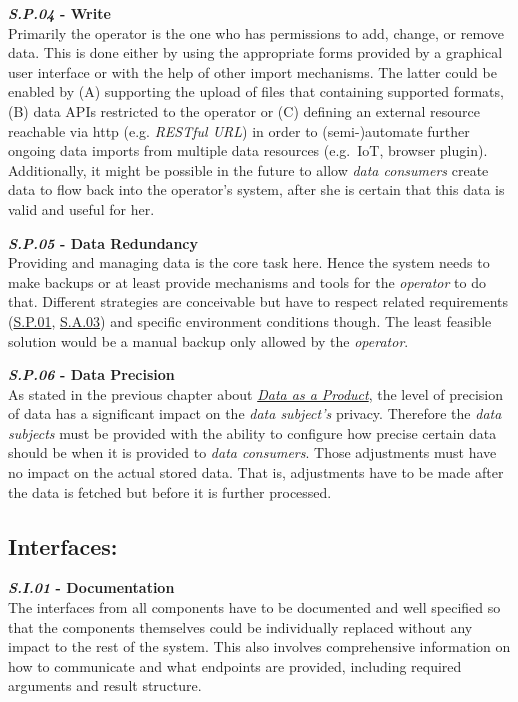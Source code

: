 \documentclass[12pt,english,a4paper,titlepage,cleardoublepage=empty,dottedtoc]{report}
\begin{document}
\textbf{\emph{\protect\hypertarget{sp04}{}{S.P.04}} - Write}\\
Primarily the operator is the one who has permissions to add, change, or
remove data. This is done either by using the appropriate forms provided
by a graphical user interface or with the help of other import
mechanisms. The latter could be enabled by (A) supporting the upload of
files that containing supported formats, (B) data APIs restricted to the
operator or (C) defining an external resource reachable via http (e.g.
\emph{RESTful URL}) in order to (semi-)automate further ongoing data
imports from multiple data resources (e.g.~IoT, browser plugin).
Additionally, it might be possible in the future to allow \emph{data
consumers} create data to flow back into the operator's system, after
she is certain that this data is valid and useful for her.

\textbf{\emph{\protect\hypertarget{sp05}{}{S.P.05}} - Data Redundancy}\\
Providing and managing data is the core task here. Hence the system
needs to make backups or at least provide mechanisms and tools for the
\emph{operator} to do that. Different strategies are conceivable but
have to respect related requirements (\protect\hyperlink{sp01}{S.P.01},
\protect\hyperlink{sa03}{S.A.03}) and specific environment conditions
though. The least feasible solution would be a manual backup only
allowed by the \emph{operator}.

\textbf{\emph{\protect\hypertarget{sp06}{}{S.P.06}} - Data Precision}\\
As stated in the previous chapter about
\emph{\protect\hyperlink{personal-data-as-a-product}{Data as a
Product}}, the level of precision of data has a significant impact on
the \emph{data subject's} privacy. Therefore the \emph{data subjects}
must be provided with the ability to configure how precise certain data
should be when it is provided to \emph{data consumers}. Those
adjustments must have no impact on the actual stored data. That is,
adjustments have to be made after the data is fetched but before it is
further processed.

\subsection*{Interfaces:}\label{interfaces}

\textbf{\emph{\protect\hypertarget{si01}{}{S.I.01}} - Documentation}\\
The interfaces from all components have to be documented and well
specified so that the components themselves could be individually
replaced without any impact to the rest of the system. This also
involves comprehensive information on how to communicate and what
endpoints are provided, including required arguments and result
structure.
\end{document}

